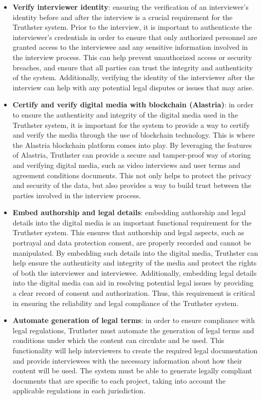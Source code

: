 \documentclass[target=mst,aauheader=]{thud}
\begin{document}
\begin{itemize}

    \item \textbf{Verify interviewer identity}: ensuring the verification of an interviewer's identity before and after the interview is a crucial requirement for the Truthster system. Prior to the interview, it is important to authenticate the interviewer's credentials in order to ensure that only authorized personnel are granted access to the interviewee and any sensitive information involved in the interview process. This can help prevent unauthorized access or security breaches, and ensure that all parties can trust the integrity and authenticity of the system. Additionally, verifying the identity of the interviewer after the interview can help with any potential legal disputes or issues that may arise.
    \item \textbf{Certify and verify digital media with blockchain (Alastria)}: in order to ensure the authenticity and integrity of the digital media used in the Truthster system, it is important for the system to provide a way to certify and verify the media through the use of blockchain technology. This is where the Alastria blockchain platform comes into play. By leveraging the features of Alastria, Truthster can provide a secure and tamper-proof way of storing and verifying digital media, such as video interviews and user terms and agreement conditions documents. This not only helps to protect the privacy and security of the data, but also provides a way to build trust between the parties involved in the interview process.
    \item \textbf{Embed authorship and legal details}: embedding authorship and legal details into the digital media is an important functional requirement for the Truthster system. This ensures that authorship and legal aspects, such as portrayal and data protection consent, are properly recorded and cannot be manipulated. By embedding such details into the digital media, Truthster can help ensure the authenticity and integrity of the media and protect the rights of both the interviewer and interviewee. Additionally, embedding legal details into the digital media can aid in resolving potential legal issues by providing a clear record of consent and authorization. Thus, this requirement is critical in ensuring the reliability and legal compliance of the Truthster system.
    \item \textbf{Automate generation of legal terms}: in order to ensure compliance with legal regulations, Truthster must automate the generation of legal terms and conditions under which the content can circulate and be used. This functionality will help interviewers to create the required legal documentation and provide interviewees with the necessary information about how their content will be used. The system must be able to generate legally compliant documents that are specific to each project, taking into account the applicable regulations in each jurisdiction.

\end{itemize}
\end{document}
